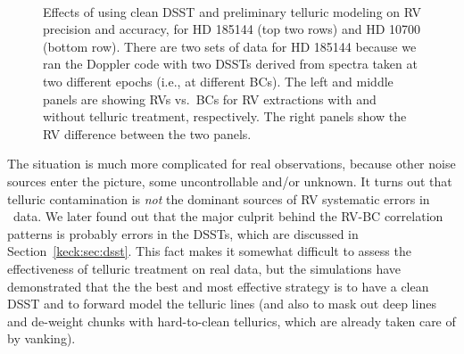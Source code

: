 \begin{figure}
\
\
\
\caption{Effects of using clean DSST and preliminary telluric modeling
  on RV precision and accuracy, for HD 185144 (top two rows) and HD
  10700 (bottom row). There are two sets of data for HD 185144 because
  we ran the Doppler code with two DSSTs derived from spectra taken at
  two different epochs (i.e., at different BCs). The left and middle
  panels are showing RVs vs.\ BCs for RV extractions with and without
  telluric treatment, respectively. The right panels show the RV
  difference between the two panels.
\label{telluric:fig:real}}
\end{figure}


The situation is much more complicated for real observations, because
other noise sources enter the picture, some uncontrollable and/or
unknown. It turns out that telluric contamination is {\em not} the
dominant sources of RV systematic errors in \keck\ data. We later
found out that the major culprit behind the RV-BC correlation patterns
is probably errors in the DSSTs, which are discussed in
Section~\ref{keck:sec:dsst}. This fact makes it somewhat difficult to
assess the effectiveness of telluric treatment on real data, but the
simulations have demonstrated that the the best and most effective strategy
is to have a clean DSST and to forward model the telluric lines (and
also to mask out deep lines and de-weight chunks with hard-to-clean
tellurics, which are already taken care of by vanking).

